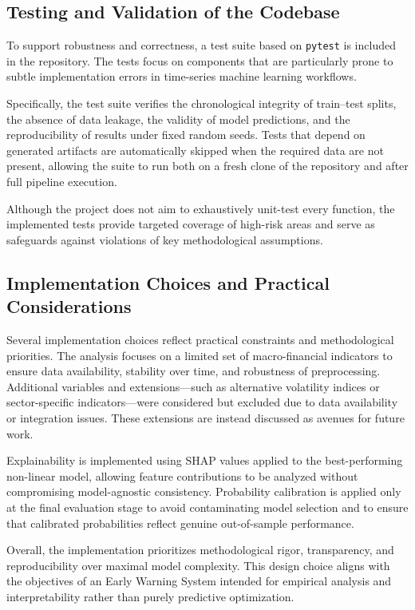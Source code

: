 \documentclass[11pt,a4paper]{article}
\begin{document}
\subsection{Testing and Validation of the Codebase}
\label{subsec:testing}

To support robustness and correctness, a test suite based on \texttt{pytest} is included in the repository. The tests focus on components that are particularly prone to subtle implementation errors in time-series machine learning workflows.

Specifically, the test suite verifies the chronological integrity of train–test splits, the absence of data leakage, the validity of model predictions, and the reproducibility of results under fixed random seeds. Tests that depend on generated artifacts are automatically skipped when the required data are not present, allowing the suite to run both on a fresh clone of the repository and after full pipeline execution.

Although the project does not aim to exhaustively unit-test every function, the implemented tests provide targeted coverage of high-risk areas and serve as safeguards against violations of key methodological assumptions.

\subsection{Implementation Choices and Practical Considerations}
\label{subsec:implementation_choices}

Several implementation choices reflect practical constraints and methodological priorities. The analysis focuses on a limited set of macro-financial indicators to ensure data availability, stability over time, and robustness of preprocessing. Additional variables and extensions—such as alternative volatility indices or sector-specific indicators—were considered but excluded due to data availability or integration issues. These extensions are instead discussed as avenues for future work.

Explainability is implemented using SHAP values applied to the best-performing non-linear model, allowing feature contributions to be analyzed without compromising model-agnostic consistency. Probability calibration is applied only at the final evaluation stage to avoid contaminating model selection and to ensure that calibrated probabilities reflect genuine out-of-sample performance.

Overall, the implementation prioritizes methodological rigor, transparency, and reproducibility over maximal model complexity. This design choice aligns with the objectives of an Early Warning System intended for empirical analysis and interpretability rather than purely predictive optimization.
\end{document}
